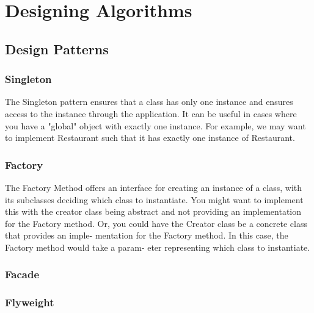 \documentclass{article}
\begin{document}
\clearpage
\section{Designing Algorithms}

	\subsection{Design Patterns}

		\subsubsection{Singleton}
		The Singleton pattern ensures that a class has only one instance and ensures access to
		the instance through the application. It can be useful in cases where you have a "global"
		object with exactly one instance. For example, we may want to implement Restaurant
		such that it has exactly one instance of Restaurant.


		\subsubsection{Factory}
		The Factory Method offers an interface for creating an instance of a class, with its
		subclasses deciding which class to instantiate. You might want to implement this with
		the creator class being abstract and not providing an implementation for the Factory
		method. Or, you could have the Creator class be a concrete class that provides an imple-
		mentation for the Factory method. In this case, the Factory method would take a param-
		eter representing which class to instantiate.

		\subsubsection{Facade}
		\subsubsection{Flyweight}
\end{document}
